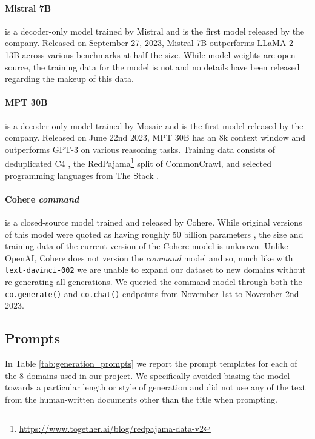 \documentclass[11pt]{article}
\begin{document}
\paragraph{Mistral 7B}\cite{jiang2023mistral} is a decoder-only model trained by Mistral and is the first model released by the company. Released on September 27, 2023, Mistral 7B outperforms LLaMA 2 13B across various benchmarks at half the size. While model weights are open-source, the training data for the model is not and no details have been released regarding the makeup of this data.

\paragraph{MPT 30B}\cite{MosaicML2023Introducing} is a decoder-only model trained by Mosaic and is the first model released by the company. Released on June 22nd 2023, MPT 30B has an 8k context window and outperforms GPT-3 on various reasoning tasks. Training data consists of deduplicated C4 \cite{raffel2020exploring,lee-etal-2022-deduplicating}, the RedPajama\footnote{\url{https://www.together.ai/blog/redpajama-data-v2}} split of CommonCrawl, and selected programming languages from The Stack \cite{Kocetkov2022TheStack}.

\paragraph{Cohere \textit{command}}\cite{Cohere2024} is a closed-source model trained and released by Cohere. While original versions of this model were quoted as having roughly 50 billion parameters \cite{liang2023holistic}, the size and training data of the current version of the Cohere model is unknown. Unlike OpenAI, Cohere does not version the \textit{command} model and so, much like with \texttt{text-davinci-002} we are unable to expand our dataset to new domains without re-generating all generations. We queried the command model through both the \texttt{co.generate()} and \texttt{co.chat()} endpoints from November 1st to November 2nd 2023.

\subsection{Prompts}
\label{app:prompts}
In Table \ref{tab:generation_prompts} we report the prompt templates for each of the 8 domains used in our project. We specifically avoided biasing the model towards a particular length or style of generation and did not use any of the text from the human-written documents other than the title when prompting. 
\end{document}
